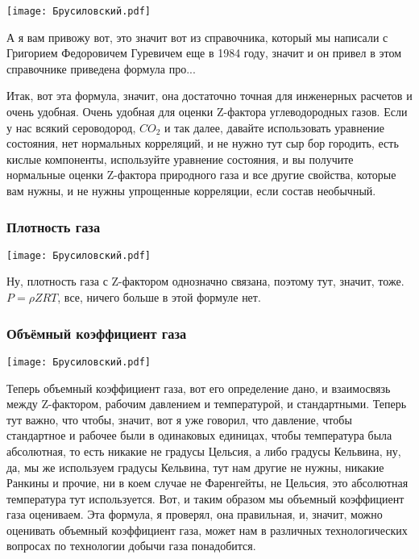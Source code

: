 \documentclass[main.tex]{subfiles}
\begin{document}
\begin{center}
\texttt{[image: Брусиловский.pdf]}
\end{center}

А я вам привожу вот, это значит вот из справочника, который мы написали с Григорием Федоровичем Гуревичем еще в 1984 году, значит и он привел в этом справочнике приведена формула про...

Итак, вот эта формула, значит, она достаточно точная для инженерных расчетов и очень удобная.
Очень удобная для оценки Z-фактора углеводородных газов.
Если у нас всякий сероводород, $CO_2$ и так далее, давайте использовать уравнение состояния, нет нормальных корреляций, и не нужно тут сыр бор городить, есть кислые компоненты, используйте уравнение состояния, и вы получите нормальные оценки Z-фактора природного газа и все другие свойства, которые вам нужны, и не нужны упрощенные корреляции, если состав необычный.

\subsubsection{Плотность газа}

\begin{center}
\texttt{[image: Брусиловский.pdf]}
\end{center}

Ну, плотность газа с Z-фактором однозначно связана, поэтому тут, значит, тоже.
$P=\rho ZRT$, все, ничего больше в этой формуле нет.

\subsubsection{Объёмный коэффициент газа}

\begin{center}
\texttt{[image: Брусиловский.pdf]}
\end{center}

Теперь объемный коэффициент газа, вот его определение дано, и взаимосвязь между Z-фактором, рабочим давлением и температурой, и стандартными.
Теперь тут важно, что чтобы, значит, вот я уже говорил, что давление, чтобы стандартное и рабочее были в одинаковых единицах, чтобы температура была абсолютная, то есть никакие не градусы Цельсия, а либо градусы Кельвина, ну, да, мы же используем градусы Кельвина, тут нам другие не нужны, никакие Ранкины и прочие, ни в коем случае не Фаренгейты, не Цельсия, это абсолютная температура тут используется.
Вот, и таким образом мы объемный коэффициент газа оцениваем.
Эта формула, я проверял, она правильная, и, значит, можно оценивать объемный коэффициент газа, может нам в различных технологических вопросах по технологии добычи газа понадобится.
\end{document}
